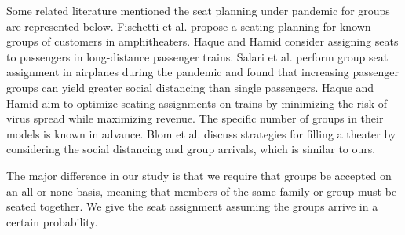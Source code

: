 

Some related literature mentioned the seat planning under pandemic for groups are represented below.
Fischetti et al. \cite{fischetti2021safe} propose a seating planning for known groups of customers in amphitheaters. Haque and Hamid \cite{haque2022optimization} consider assigning seats to passengers in long-distance passenger trains. Salari et al. \cite{salari2022social} perform group seat assignment in airplanes during the pandemic and found that increasing passenger groups can yield greater social distancing than single passengers. Haque and Hamid \cite{haque2023social} aim to optimize seating assignments on trains by minimizing the risk of virus spread while maximizing revenue. The specific number of groups in their models is known in advance. Blom et al. \cite{blom2022filling} discuss strategies for filling a theater by considering the social distancing and group arrivals, which is similar to ours. 

The major difference in our study is that we require that groups be accepted on an all-or-none basis, meaning that members of the same family or group must be seated together. We give the seat assignment assuming the groups arrive in a certain probability.






